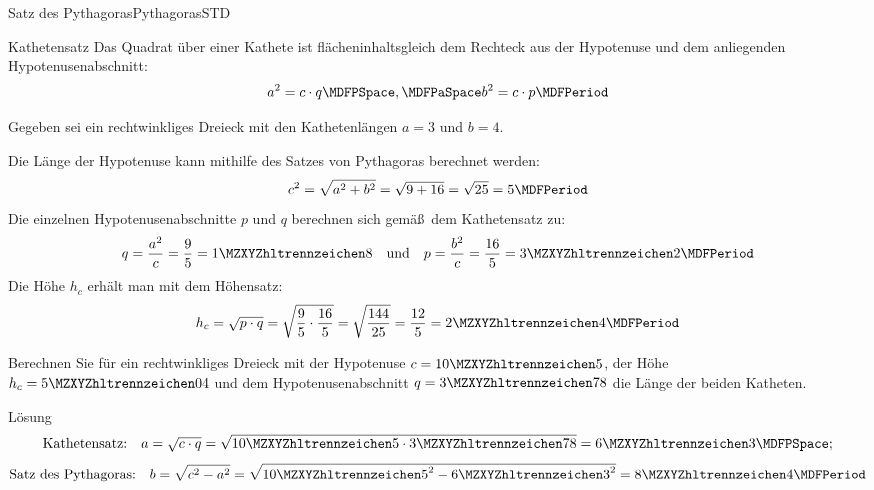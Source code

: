 \begin{MXContent}{Satz des Pythagoras}{Pythagoras}{STD}
\begin{MCOSHZusatz}
\begin{MXInfo}{Kathetensatz}
Das Quadrat \"uber einer Kathete ist fl\"acheninhaltsgleich dem Rechteck aus 
der Hypotenuse und dem anliegenden Hypotenusenabschnitt: 
\[a^2 = c\cdot q \MDFPSpace, \MDFPaSpace b^2=c\cdot p \MDFPeriod\]
\end{MXInfo}

\begin{MExample}
Gegeben sei ein rechtwinkliges Dreieck mit den Kathetenl\"angen $a=3$ und 
$b=4$.

Die L\"ange der Hypotenuse kann mithilfe des Satzes von Pythagoras berechnet 
werden:
\[c^2=\sqrt{a^2 + b^2}=\sqrt{9 + 16}=\sqrt{25}=5 \MDFPeriod\]
Die einzelnen Hypotenusenabschnitte $p$ und $q$ berechnen sich gem\"a\ss\ dem 
Kathetensatz zu:
\[
q=\frac{a^2}{c}=\frac{9}{5} = \MZahl{1}{8} \quad \text{und} \quad 
p=\frac{b^2}{c}=\frac{16}{5} = \MZahl{3}{2} \MDFPeriod
\]
Die H\"ohe $h_c$ erh\"alt man mit dem H\"ohensatz:
\[
h_c=\sqrt{p\cdot q}=\sqrt{\frac{9}{5}\cdot\frac{16}{5}} %
=\sqrt{\frac{144}{25}}=\frac{12}{5} = \MZahl{2}{4} \MDFPeriod\]
\end{MExample}

\begin{MExercise}
Berechnen Sie f\"ur ein rechtwinkliges Dreieck mit der Hypotenuse $c=\MZahl{10}{5}$, der H\"ohe $h_c=\MZahl{5}{04}$ und dem Hypotenusenabschnitt $q=\MZahl{3}{78}$ die L\"ange der beiden Katheten.

\begin{MHint}{L\"osung}
\[\text{Kathetensatz:} \quad a=\sqrt{c\cdot q}=\sqrt{\MZahl{10}{5} \cdot \MZahl{3}{78}}=\MZahl{6}{3} \MDFPSpace;\]
\[\text{Satz des Pythagoras:} \quad b=\sqrt{c^2-a^2} = \sqrt{{\MZahl{10}{5}}^2-{\MZahl{6}{3}}^2}=\MZahl{8}{4} \MDFPeriod\]
\end{MHint}
\end{MExercise}
\end{MCOSHZusatz}

\end{MXContent}


